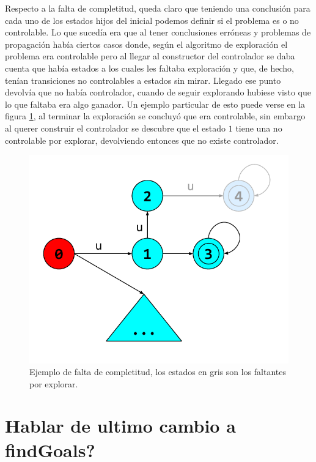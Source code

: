 Respecto a la falta de completitud, queda claro que teniendo una conclusión para cada uno de los estados hijos del inicial podemos definir si el problema es o no controlable. 
Lo que sucedía era que al tener conclusiones erróneas y problemas de propagación había ciertos casos donde, según el algoritmo de exploración el problema era controlable pero al llegar al constructor del controlador se daba cuenta que había estados a los cuales les faltaba exploración y que, de hecho, tenían transiciones no controlables a estados sin mirar. 
Llegado ese punto devolvía que no había controlador, cuando de seguir explorando hubiese visto que lo que faltaba era algo ganador. Un ejemplo particular de esto puede verse en la figura \ref{fig:faltaCompletitud}, al terminar la exploración se concluyó que era controlable, sin embargo al querer construir el controlador se descubre que el estado $1$ tiene una no controlable por explorar, devolviendo entonces que no existe controlador. 

\begin{figure}[htb]
 \centering
 \includegraphics[width=\linewidth/2]{figures/faltaDeCompletitud.pdf}
 \caption{Ejemplo de falta de completitud, los estados en gris son los faltantes por explorar.}
 \label{fig:faltaCompletitud}
\end{figure}    



\section{Hablar de ultimo cambio a findGoals?}







